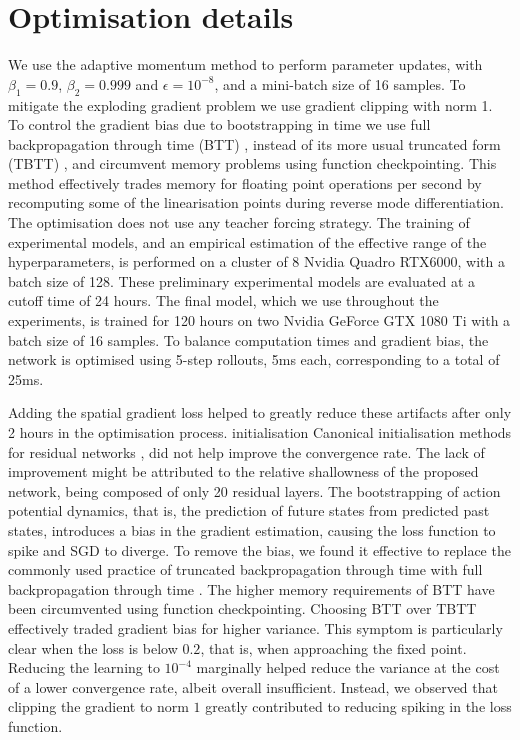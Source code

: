 \documentclass[utf8]{frontiers_suppmat} %
\begin{document}
\section{Optimisation details}
\label{sec:supp:optimisation}
We use the adaptive momentum method \cite[]{Kingma2015Adam:Optimization} to perform parameter updates, with $\beta_1=0.9$, $\beta_2=0.999$ and $\epsilon=10^{-8}$, and a mini-batch size of 16 samples.
To mitigate the exploding gradient problem \cite[]{Bengio1994LearningDifficult} we use gradient clipping \cite[]{Pascanu2013OnNetworks} with norm 1.
To control the gradient bias due to bootstrapping in time we use full backpropagation through time (BTT) \cite[]{P.J.Werbos1990BackpropagationIt}, instead of its more usual truncated form (TBTT) \cite[p. 14]{jaeger2002tutorial}, and circumvent memory problems using function checkpointing.
This method effectively trades memory for floating point operations per second by recomputing some of the linearisation points during reverse mode differentiation.
The optimisation does not use any teacher forcing \cite[]{Williams1989ANetworks} strategy.
The training of experimental models, and an empirical estimation of the effective range of the hyperparameters, is performed on a cluster of 8 Nvidia Quadro RTX6000, with a batch size of 128.
These preliminary experimental models are evaluated at a cutoff time of 24 hours.
The final model, which we use throughout the experiments, is trained for 120 hours on two Nvidia GeForce GTX 1080 Ti with a batch size of 16 samples.
To balance computation times and gradient bias, the network is optimised using 5-step rollouts, 5ms each, corresponding to a total of 25ms.

Adding the spatial gradient loss \cite[]{kim2019deep,Lino2020SimulatingNetworks} helped to greatly reduce these artifacts after only 2 hours in the optimisation process.
initialisation
Canonical initialisation methods for residual networks \cite[]{Zhang2019FixupNormalization}, did not help improve the convergence rate. The lack of improvement might be attributed to the relative shallowness of the proposed network, being composed of only 20 residual layers.
The bootstrapping of action potential dynamics, that is, the prediction of future states from predicted past states, introduces a bias in the gradient estimation, causing the loss function to spike and SGD to diverge.
To remove the bias, we found it effective to replace the commonly used practice of truncated backpropagation through time \cite[]{jaeger2002tutorial} with full backpropagation through time \cite[]{P.J.Werbos1990BackpropagationIt}. The higher memory requirements of BTT have been circumvented using function checkpointing.
Choosing BTT over TBTT effectively traded gradient bias for higher variance.
This symptom is particularly clear when the loss is below $0.2$, that is, when approaching the fixed point.
Reducing the learning to $10^{-4}$ marginally helped reduce the variance at the cost of a lower convergence rate, albeit overall insufficient.
Instead, we observed that clipping the gradient to norm $1$ greatly contributed to reducing spiking in the loss function.
\end{document}
